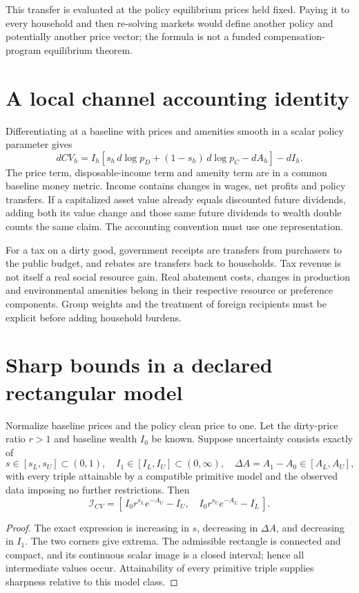 \documentclass[11pt]{article}
\begin{document}
This transfer is evaluated at the policy equilibrium prices held fixed. Paying it to every household and then re-solving markets would define another policy and potentially another price vector; the formula is not a funded compensation-program equilibrium theorem.

\section*{A local channel accounting identity}
Differentiating at a baseline with prices and amenities smooth in a scalar policy parameter gives
\[
 dCV_h=I_h[s_h\,d\log p_D+(1-s_h)\,d\log p_C-dA_h]-dI_h.
\]
The price term, disposable-income term and amenity term are in a common baseline money metric. Income contains changes in wages, net profits and policy transfers. If a capitalized asset value already equals discounted future dividends, adding both its value change and those same future dividends to wealth double counts the same claim. The accounting convention must use one representation.

For a tax on a dirty good, government receipts are transfers from purchasers to the public budget, and rebates are transfers back to households. Tax revenue is not itself a real social resource gain. Real abatement costs, changes in production and environmental amenities belong in their respective resource or preference components. Group weights and the treatment of foreign recipients must be explicit before adding household burdens.

\section*{Sharp bounds in a declared rectangular model}
Normalize baseline prices and the policy clean price to one. Let the dirty-price ratio $r>1$ and baseline wealth $I_0$ be known. Suppose uncertainty consists exactly of
\[
 s\in[s_L,s_U]\subset(0,1),\quad
 I_1\in[I_L,I_U]\subset(0,\infty),\quad
 \Delta A=A_1-A_0\in[A_L,A_U],
\]
with every triple attainable by a compatible primitive model and the observed data imposing no further restrictions. Then
\[
 \mathcal I_{CV}=
 [\,I_0r^{s_L}e^{-A_U}-I_U,\quad
    I_0r^{s_U}e^{-A_L}-I_L\,].
\]
\begin{proof}
The exact expression is increasing in $s$, decreasing in $\Delta A$, and decreasing in $I_1$. The two corners give extrema. The admissible rectangle is connected and compact, and its continuous scalar image is a closed interval; hence all intermediate values occur. Attainability of every primitive triple supplies sharpness relative to this model class.
\end{proof}
\end{document}
